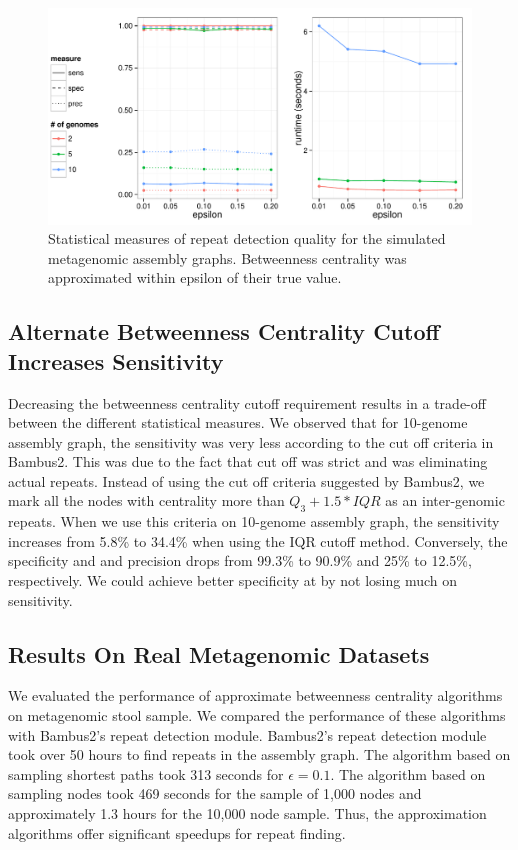 \documentclass[runningheads,a4paper]{llncs}
\begin{document}
\begin{figure}[htbp]
\centering
\includegraphics[width = \textwidth]{sampled_paths}
\caption{Statistical measures of repeat detection quality for the simulated metagenomic assembly graphs. Betweenness centrality was approximated within epsilon of their true value.}
\label{fig:sampled_paths}
\end{figure}

\subsection*{Alternate Betweenness Centrality Cutoff Increases Sensitivity}

Decreasing the betweenness centrality cutoff requirement results in a trade-off between the different statistical measures.
We observed that for 10-genome assembly graph, the sensitivity was very less according to the cut off criteria in Bambus2. This was due to the fact that cut off was strict and was eliminating actual repeats.
Instead of using the cut off criteria suggested by Bambus2, we mark all the nodes with centrality more than $Q_{3} + 1.5*IQR$ as an inter-genomic repeats.
When we use this criteria on 10-genome assembly graph, the sensitivity increases from 5.8\% to 34.4\% when using the IQR cutoff method.
Conversely, the specificity and and precision drops from 99.3\% to 90.9\% and 25\% to 12.5\%, respectively.
We could achieve better specificity at by not losing much on sensitivity.

\subsection*{Results On Real Metagenomic Datasets}
We evaluated the performance of approximate betweenness centrality algorithms on metagenomic stool sample.
We compared the performance of these algorithms with Bambus2's repeat detection module.
Bambus2's repeat detection module took over 50 hours to find repeats in the assembly graph.
The algorithm based on sampling shortest paths took 313 seconds for $\epsilon = 0.1$.
The algorithm based on sampling nodes took 469 seconds for the sample of 1,000 nodes and approximately 1.3 hours for the 10,000 node sample. Thus, the approximation algorithms offer significant speedups for repeat finding.  
\end{document}
